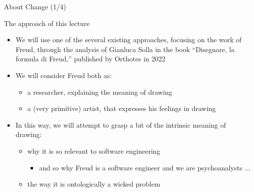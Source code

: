 \documentclass{beamer}
\begin{document}
\begin{frame}
{\centerline{About Change (1/4)}}
 

\end{frame}


\begin{frame}
{\centerline{The approach of this lecture}}
 
\begin{itemize}
\item We will use one of the several existing approaches, focusing on the work of Freud, through the analysis of Gianluca Solla in the book ``Disegnare, la formula di Freud,'' published by Orthotes in 2022
\item We will consider Freud both as:
\begin{itemize}
\item a researcher, explaining the meaning of drawing
\item a (very primitive) artist, that expresses his feelings in drawing
\end{itemize} 
\item In this way, we will attempt to grasp a bit of the intrinsic meaning of drawing:
\begin{itemize}
\item why it is so relevant to software engineering
\begin{itemize}
\item and so why Freud is a software engineer and we are psychoanalysts ...
\end{itemize} 
\item the way it is ontologically a wicked problem
\end{itemize} 
\end{itemize} 

\end{frame}
\end{document}
